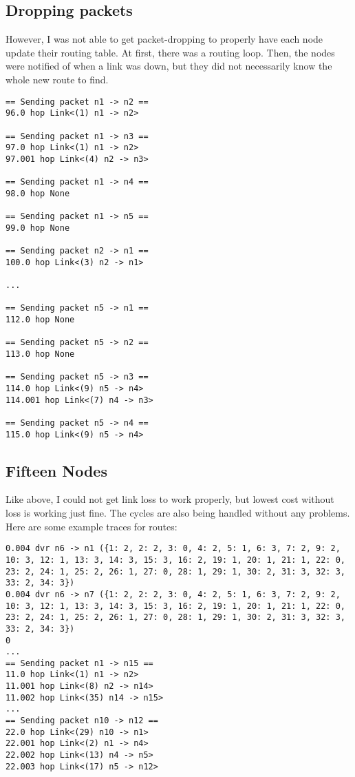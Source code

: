 \documentclass[fleqn,11pt]{article}
\begin{document}
\subsection{Dropping packets}
However, I was not able to get packet-dropping to properly have each node update their routing table.
At first, there was a routing loop.
Then, the nodes were notified of when a link was down, but they did not necessarily know the whole new route to find.
\begin{verbatim}    
== Sending packet n1 -> n2 ==
96.0 hop Link<(1) n1 -> n2>
                                        
== Sending packet n1 -> n3 ==
97.0 hop Link<(1) n1 -> n2>
97.001 hop Link<(4) n2 -> n3>
                                        
== Sending packet n1 -> n4 ==
98.0 hop None
                                        
== Sending packet n1 -> n5 ==
99.0 hop None
                                        
== Sending packet n2 -> n1 ==
100.0 hop Link<(3) n2 -> n1>
                                        
...
    
== Sending packet n5 -> n1 ==
112.0 hop None
                                        
== Sending packet n5 -> n2 ==
113.0 hop None
                                        
== Sending packet n5 -> n3 ==
114.0 hop Link<(9) n5 -> n4>
114.001 hop Link<(7) n4 -> n3>
                                        
== Sending packet n5 -> n4 ==
115.0 hop Link<(9) n5 -> n4>
\end{verbatim}

\subsection{Fifteen Nodes}
Like above, I could not get link loss to work properly, but lowest cost without loss is working just fine.
The cycles are also being handled without any problems.
Here are some example traces for routes:
\begin{verbatim}
0.004 dvr n6 -> n1 ({1: 2, 2: 2, 3: 0, 4: 2, 5: 1, 6: 3, 7: 2, 9: 2, 10: 3, 12: 1, 13: 3, 14: 3, 15: 3, 16: 2, 19: 1, 20: 1, 21: 1, 22: 0, 23: 2, 24: 1, 25: 2, 26: 1, 27: 0, 28: 1, 29: 1, 30: 2, 31: 3, 32: 3, 33: 2, 34: 3})
0.004 dvr n6 -> n7 ({1: 2, 2: 2, 3: 0, 4: 2, 5: 1, 6: 3, 7: 2, 9: 2, 10: 3, 12: 1, 13: 3, 14: 3, 15: 3, 16: 2, 19: 1, 20: 1, 21: 1, 22: 0, 23: 2, 24: 1, 25: 2, 26: 1, 27: 0, 28: 1, 29: 1, 30: 2, 31: 3, 32: 3, 33: 2, 34: 3})
0
...
== Sending packet n1 -> n15 ==
11.0 hop Link<(1) n1 -> n2>
11.001 hop Link<(8) n2 -> n14>
11.002 hop Link<(35) n14 -> n15>
...
== Sending packet n10 -> n12 ==
22.0 hop Link<(29) n10 -> n1>
22.001 hop Link<(2) n1 -> n4>
22.002 hop Link<(13) n4 -> n5>
22.003 hop Link<(17) n5 -> n12>
\end{verbatim}
\end{document}

